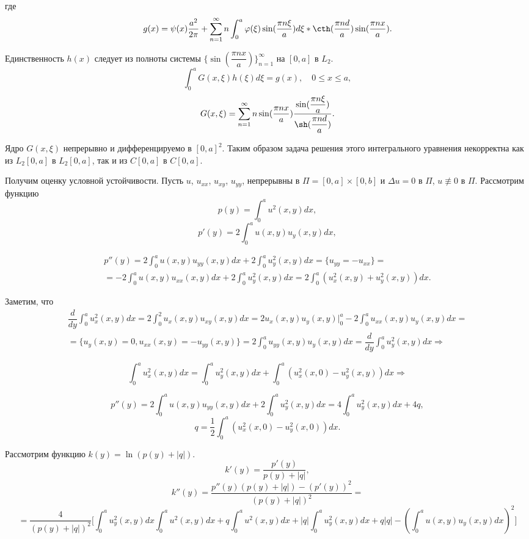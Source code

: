 \documentclass{article}
\begin{document}
где 
\[
	g(x) = \psi(x) \frac{a^2}{2 \pi} + 
	\sum_{n=1}^{\infty} n \int_0^a  \varphi(\xi) \sin(\dfrac{ \pi n \xi }{a}) d \xi *
	\cth (\dfrac{\pi n d}{a}) \sin (\dfrac{\pi n x}{a}).
\]

Единственность $h(x)$ следует из полноты системы $\{\sin (\dfrac{\pi n x}{a})\}_{n=1}^{\infty}$ на $[0,a]$ в $L_2$.
\[
	\int_0^a G(x,\xi) h(\xi) d \xi = g(x), \quad 0 \leqslant x \leqslant a,
\]
\[
	G(x,\xi) =  \sum_{n=1}^{\infty} n \sin (\dfrac{\pi n x}{a})  \dfrac{\sin (\dfrac{\pi n \xi}{a})}{\sh (\dfrac{\pi n d}{a})}.
\]

Ядро $G(x,\xi)$ непрерывно и дифференцируемо в $[0,a]^2$. 
Таким образом задача решения этого интегрального уравнения некорректна как из $L_2[0,a]$ в $L_2[0,a]$, так и из $C[0,a]$ в $C[0,a]$.

Получим оценку условной устойчивости. 
Пусть $u$, $u_{xx}$, $u_{xy}$, $u_{yy}$, непрерывны в $\Pi = [0,a] \times [0,b]$ и $\Delta u = 0$ в $\Pi$, $u \nequiv 0$ в $\Pi$.
Рассмотрим функцию
\[
	p(y) = \int_0^a u^2 (x,y) dx,
\]
\[
	p'(y) = 2 \int_0^a u (x,y) u_y(x,y) dx,
\]

\begin{multline*}
	p''(y) = 2 \int_0^a u (x,y) u_{yy}(x,y) dx + 2 \int_0^a u_y^2 (x,y) dx = \{ u_{yy} = - u_{xx} \} = \\
	= -2 \int_0^a u (x,y) u_{xx}(x,y)dx + 2 \int_0^a u_y^2(x,y)dx 
	=  2 \int_0^a (u_x^2(x,y) + u_y^2(x,y))dx.
\end{multline*}

Заметим, что
\begin{multline*}
	\dfrac{d}{dy} \int_0^a u_x^2(x,y)dx =
 	2 \int_0^2 u_x(x,y) u_{xy}(x,y) dx = 
 	2 u_x(x,y) u_y(x,y) \bigg|_0^a - 2 \int_0^a u_{xx}(x,y) u_y(x,y) dx =\\
	= \{ u_y(x,y) = 0, u_{xx}(x,y) = -u_{yy}(x,y) \} =
 	2 \int_0^a u_{yy}(x,y) u_y(x,y) dx = \dfrac{d}{dy} \int_0^a u_y^2(x,y)dx \Rightarrow
\end{multline*}

\[
	\int_0^a u_x^2(x,y)dx = \int_0^a u_y^2(x,y) dx + \int_0^a (u_x^2(x,0) - u_y^2(x,y)) dx \Rightarrow
\]

\[
	p''(y) = 2 \int_0^a u(x,y) u_{yy}(x,y)dx + 2 \int_0^a u_y^2(x,y) dx = 4 \int_0^a u_y^2(x,y) dx + 4q,
\]
\[
	q = \dfrac{1}{2} \int_0^a (u_x^2(x,0) - u_y^2(x,0))dx.
\]

Рассмотрим функцию $k(y) = \ln (p(y) + |q|)$.
\[
	k'(y) = \dfrac{p'(y)}{p(y) + |q|}, 
\]
\[
	k''(y) = \dfrac{p''(y) (p(y) + |q|) - (p'(y))^2}{(p(y) + |q|)^2} = 
\]
\[
	=\dfrac{4}{(p(y) + |q|)^2} \bigg[ \int_0^a u_y^2(x,y) dx \int_0^a u^2(x,y)dx + q \int_0^a u^2(x,y) dx + 
	|q| \int_0^a u_y^2(x,y)dx + q |q| - (\int_0^a u(x,y) u _y(x,y)dx)^2 \bigg]
\]
\end{document}
